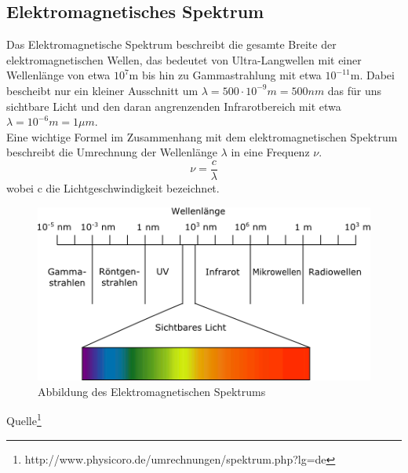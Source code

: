 \documentclass{article}
\begin{document}
    \subsection{Elektromagnetisches Spektrum}
        Das Elektromagnetische Spektrum beschreibt die gesamte Breite der elektromagnetischen Wellen, das bedeutet
        von Ultra-Langwellen mit einer Wellenlänge von etwa $10^7$m bis hin zu Gammastrahlung mit etwa $10^{-11}$m. Dabei
        bescheibt nur ein kleiner Ausschnitt um $\lambda=500\cdot 10^{-9}m=500nm$ das für uns sichtbare Licht und den daran 
        angrenzenden Infrarotbereich mit etwa $\lambda=10^{-6}m=1\mu m$.\\
        Eine wichtige Formel im Zusammenhang mit dem elektromagnetischen Spektrum beschreibt die Umrechnung der Wellenlänge
        $\lambda$ in eine Frequenz $\nu$.
        \begin{equation}
            \nu = \frac{c}{\lambda}
        \end{equation}
        wobei c die Lichtgeschwindigkeit bezeichnet.
        \begin{figure}[H]
            \centering
            \includegraphics{Images/EMSpektrum.png}
            \caption{Abbildung des Elektromagnetischen Spektrums}
        \end{figure}
        \begin{center}
            Quelle\footnote{http://www.physicoro.de/umrechnungen/spektrum.php?lg=de}
        \end{center} 
        
    
\end{document}

